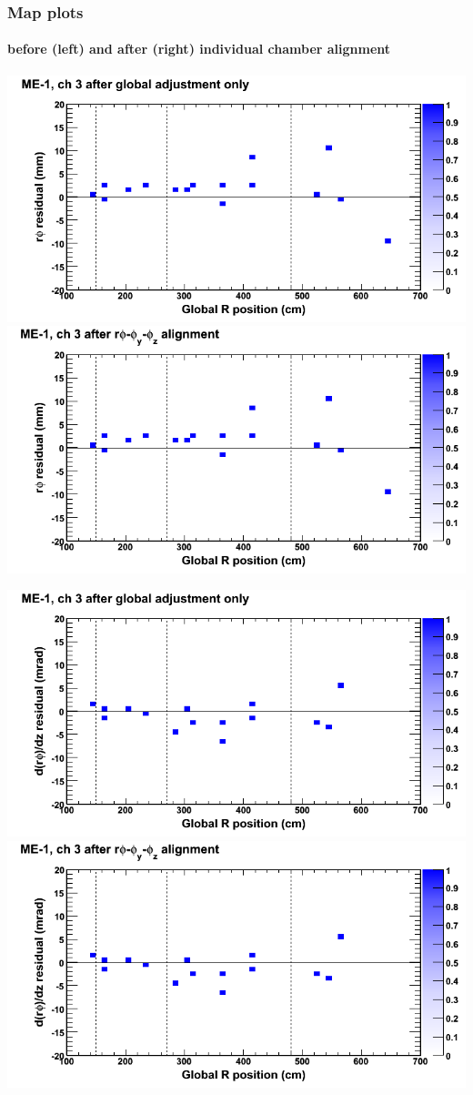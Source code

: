 \documentclass[compress]{beamer}
\begin{document}
\begin{frame}
\frametitle{Map plots}
\framesubtitle{before (left) and after (right) individual chamber alignment}
\includegraphics[width=0.5\linewidth]{ringmapplots_3dof/before_CSCvsr_mem1ch03_x.png} \includegraphics[width=0.5\linewidth]{ringmapplots_3dof/after_CSCvsr_mem1ch03_x.png}

\includegraphics[width=0.5\linewidth]{ringmapplots_3dof/before_CSCvsr_mem1ch03_dxdz.png} \includegraphics[width=0.5\linewidth]{ringmapplots_3dof/after_CSCvsr_mem1ch03_dxdz.png}
\end{frame}
\end{document}
